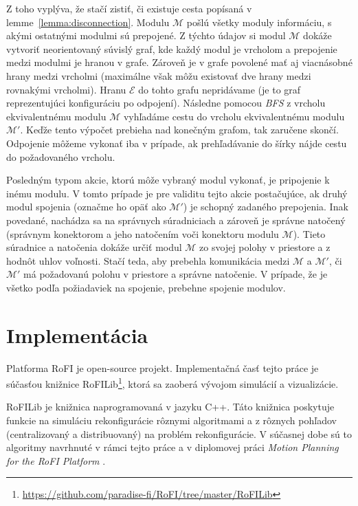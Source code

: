 \documentclass[
  digital, %
  oneside, %
  notable,   %
  lof,     %
  nolot,     %
]{fithesis3}
\begin{document}
Z toho vyplýva, že stačí zistiť, či existuje cesta popísaná v lemme~\ref{lemma:disconnection}. Modulu $\mathcal{M}$ pošlú všetky moduly informáciu, s akými ostatnými modulmi sú prepojené. Z týchto údajov si modul $\mathcal{M}$ dokáže vytvoriť neorientovaný súvislý graf, kde každý modul je vrcholom a prepojenie medzi modulmi je hranou v grafe. Zároveň je v grafe povolené mať aj viacnásobné hrany medzi vrcholmi (maximálne však môžu existovať dve hrany medzi rovnakými vrcholmi). Hranu $\mathcal{E}$ do tohto grafu nepridávame (je to graf reprezentujúci konfiguráciu po odpojení). Následne pomocou \textit{BFS} z vrcholu ekvivalentnému modulu $\mathcal{M}$ vyhľadáme cestu do vrcholu ekvivalentnému modulu $\mathcal{M}'$. Keďže tento výpočet prebieha nad konečným grafom, tak zaručene skončí. Odpojenie môžeme vykonať iba v prípade, ak prehľadávanie do šírky nájde cestu do požadovaného vrcholu. 

Posledným typom akcie, ktorú môže vybraný modul vykonať, je pripojenie k inému modulu. V tomto prípade je pre validitu tejto akcie postačujúce, ak druhý modul spojenia (označme ho opäť ako $\mathcal{M}'$) je schopný zadaného prepojenia. Inak povedané, nachádza sa na správnych súradniciach a zároveň je správne natočený (správnym konektorom a jeho natočením voči konektoru modulu $\mathcal{M}$). Tieto súradnice a natočenia dokáže určiť modul $\mathcal{M}$ zo svojej polohy v priestore a z hodnôt uhlov voľnosti. Stačí teda, aby prebehla komunikácia medzi $\mathcal{M}$ a $\mathcal{M}'$, či $\mathcal{M}'$ má požadovanú polohu v priestore a správne natočenie. V prípade, že je všetko podľa požiadaviek na spojenie, prebehne spojenie modulov. 





\chapter{Implementácia}
\label{sec:implementation}
Platforma RoFI je open-source projekt. Implementačná časť tejto práce je súčasťou knižnice RoFILib\footnote{\url{https://github.com/paradise-fi/RoFI/tree/master/RoFILib}}, ktorá sa zaoberá vývojom simulácií a vizualizácie. 

RoFILib je knižnica naprogramovaná v jazyku C++. Táto knižnica poskytuje funkcie na simuláciu rekonfigurácie rôznymi algoritmami a z rôznych pohľadov (centralizovaný a distribuovaný) na problém rekonfigurácie. V súčasnej dobe sú to algoritmy navrhnuté v rámci tejto práce a v diplomovej práci \textit{Motion Planning for the RoFI Platform} \cite{vozarovaMasterThesis}.
\end{document}
